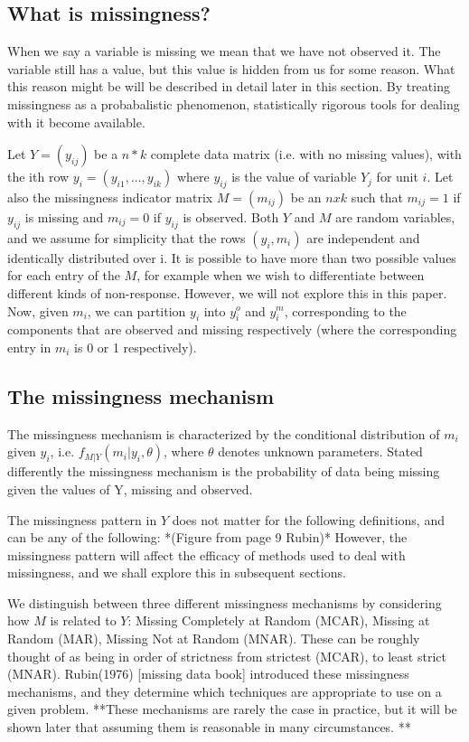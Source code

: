 \documentclass{article}
\begin{document}
	\subsection{What is missingness?}
	When we say a variable is missing we mean that we have not observed it. The variable still has a value, but this value is hidden from us for some reason. What this reason might be will be described in detail later in this section. By treating missingness as a probabalistic phenomenon, statistically rigorous tools for dealing with it become available. 
	
	Let $Y=(y_{ij})$ be a $n*k$ complete data matrix (i.e. with no missing values), with the ith row $y_{i}=(y_{i1}, ..., y_{ik})$ where $y_{ij}$ is the value of variable $Y_{j}$ for unit $i$. Let also the missingness indicator matrix $M = (m_{ij})$ be an $nxk$ such that $m_{ij} = 1$ if $y_{ij}$ is missing and $m_{ij} = 0$ if $y_{ij}$ is observed. Both $Y$ and $M$ are random variables, and we assume for simplicity that the rows $(y_{i}, m_{i})$ are independent and identically distributed over i. It is possible to have more than two possible values for each entry of the $M$, for example when we wish to differentiate between different kinds of non-response. However, we will not explore this in this paper. Now, given $m_{i}$, we can partition $y_{i}$ into $y^{o}_{i}$ and $y^{m}_{i}$, corresponding to the components that are observed and missing respectively (where the corresponding entry in $m_{i}$ is 0 or 1 respectively).
	
	\subsection{The missingness mechanism}
	
	The missingness mechanism is characterized by the conditional distribution of $m_{i}$ given $y_{i}$, i.e. $f_{M|Y}(m_{i}|y_{i}, \theta)$, where $\theta$ denotes unknown parameters. Stated differently the missingness mechanism is the probability of data being missing given the values of Y, missing and observed. 
	
	The missingness pattern in $Y$ does not matter for the following definitions, and can be any of the following: *(Figure from page 9 Rubin)* 
	However, the missingness pattern will affect the efficacy of methods used to deal with missingness, and we shall explore this in subsequent sections.
	
	We distinguish between three different missingness mechanisms by considering how $M$ is related to $Y$: Missing Completely at Random (MCAR), Missing at Random (MAR), Missing Not at Random (MNAR). These can be roughly thought of as being in order of strictness from strictest (MCAR), to least strict (MNAR). Rubin(1976) [missing data book] introduced these missingness mechanisms, and they determine which techniques are appropriate to use on a given problem. **These mechanisms are rarely the case in practice, but it will be shown later that assuming them is reasonable in many circumstances. **
	
\end{document}
